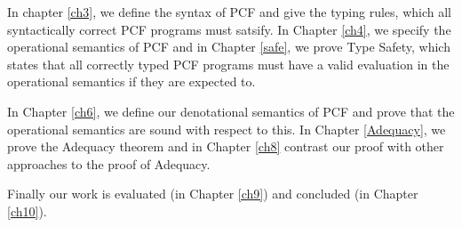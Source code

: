 In chapter \ref{ch3}, we define the syntax of PCF and give the typing rules, which all syntactically correct PCF programs must satsify. In Chapter \ref{ch4}, we specify the operational semantics of PCF and in Chapter \ref{safe}, we prove Type Safety, which states that all correctly typed PCF programs must have a valid evaluation in the operational semantics if they are expected to.

In Chapter \ref{ch6}, we define our denotational semantics of PCF and prove that the operational semantics are sound with respect to this. In Chapter \ref{Adequacy}, we prove the Adequacy theorem and in Chapter \ref{ch8} contrast our proof with other approaches to the proof of Adequacy.

Finally our work is evaluated (in Chapter \ref{ch9}) and concluded (in Chapter \ref{ch10}).
